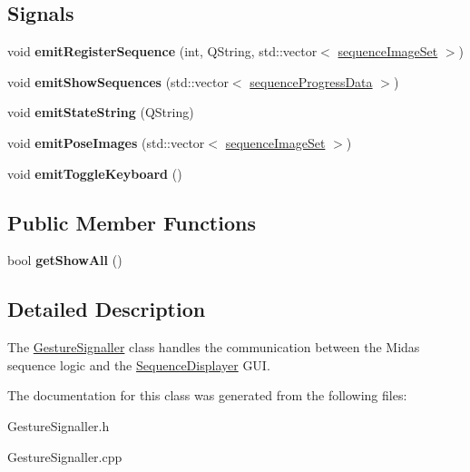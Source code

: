 \subsection*{Signals}
\begin{DoxyCompactItemize}
\item 
\hypertarget{class_gesture_signaller_a88fca41be5e113483e4224495fcd73c7}{void {\bfseries emit\+Register\+Sequence} (int, Q\+String, std\+::vector$<$ \hyperlink{structsequence_image_set}{sequence\+Image\+Set} $>$)}\label{class_gesture_signaller_a88fca41be5e113483e4224495fcd73c7}

\item 
\hypertarget{class_gesture_signaller_abe4f99d4cf0f7e88fd6284312e9b2985}{void {\bfseries emit\+Show\+Sequences} (std\+::vector$<$ \hyperlink{structsequence_progress_data}{sequence\+Progress\+Data} $>$)}\label{class_gesture_signaller_abe4f99d4cf0f7e88fd6284312e9b2985}

\item 
\hypertarget{class_gesture_signaller_a908109e51f88924f810a8d66769b0abe}{void {\bfseries emit\+State\+String} (Q\+String)}\label{class_gesture_signaller_a908109e51f88924f810a8d66769b0abe}

\item 
\hypertarget{class_gesture_signaller_aa613d8732a6427f9ec8f759a34905b31}{void {\bfseries emit\+Pose\+Images} (std\+::vector$<$ \hyperlink{structsequence_image_set}{sequence\+Image\+Set} $>$)}\label{class_gesture_signaller_aa613d8732a6427f9ec8f759a34905b31}

\item 
\hypertarget{class_gesture_signaller_a719191283f7644548430b353f8b1a453}{void {\bfseries emit\+Toggle\+Keyboard} ()}\label{class_gesture_signaller_a719191283f7644548430b353f8b1a453}

\end{DoxyCompactItemize}
\subsection*{Public Member Functions}
\begin{DoxyCompactItemize}
\item 
\hypertarget{class_gesture_signaller_a8516517898a400a28f900eec60c8d3e8}{bool {\bfseries get\+Show\+All} ()}\label{class_gesture_signaller_a8516517898a400a28f900eec60c8d3e8}

\end{DoxyCompactItemize}


\subsection{Detailed Description}
The \hyperlink{class_gesture_signaller}{Gesture\+Signaller} class handles the communication between the Midas sequence logic and the \hyperlink{class_sequence_displayer}{Sequence\+Displayer} G\+U\+I. 

The documentation for this class was generated from the following files\+:\begin{DoxyCompactItemize}
\item 
Gesture\+Signaller.\+h\item 
Gesture\+Signaller.\+cpp\end{DoxyCompactItemize}
